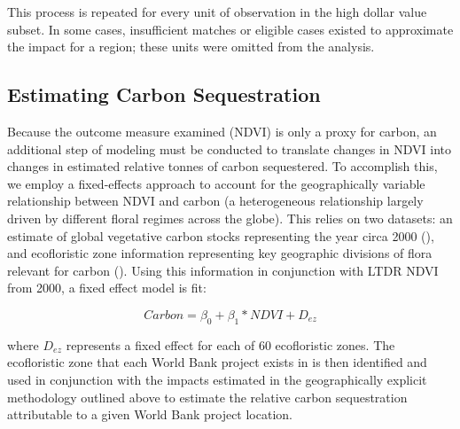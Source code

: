 \documentclass{article}\usepackage[]{graphicx}\usepackage[]{color}
\newenvironment{knitrout}{}{}  %
\begin{document}
\begin{knitrout}
\par

This process is repeated for every unit of observation in the high dollar value subset.  
In some cases, insufficient matches or eligible cases existed to approximate the impact for a region; these units were omitted from the analysis.

\subsection{Estimating Carbon Sequestration}
Because the outcome measure examined (NDVI) is only a proxy for carbon, an additional step of modeling must be conducted to translate changes in NDVI into changes in estimated relative tonnes of carbon sequestered.
To accomplish this, we employ a fixed-effects approach to account for the geographically variable relationship between NDVI and carbon (a heterogeneous relationship largely driven by different floral regimes across the globe).
This relies on two datasets: an estimate of global vegetative carbon stocks representing the year circa 2000 (\cite{saatchi_benchmark_2011}), and ecofloristic zone information representing key geographic divisions of flora relevant for carbon (\cite{ruesch_new_2008}).
Using this information in conjunction with LTDR NDVI from 2000, a fixed effect model is fit:

\begin{equation}
Carbon = \beta_{0} + \beta_{1} * NDVI + D_{ez}
\label{EQcarb}
\end{equation}

where \begin{math}D_{ez}\end{math} represents a fixed effect for each of 60 ecofloristic zones.  
The ecofloristic zone that each World Bank project exists in is then identified and used in conjunction with the impacts estimated in the geographically explicit methodology outlined above to estimate the relative carbon sequestration attributable to a given World Bank project location.



\end{knitrout}
\end{document}
